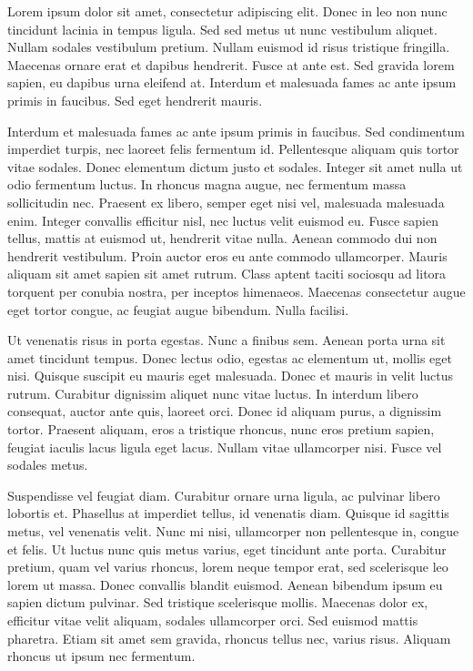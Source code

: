 \documentclass{book}
\begin{document}
            Lorem ipsum dolor sit amet, consectetur adipiscing elit. Donec in leo non nunc
               tincidunt lacinia in tempus ligula. Sed sed metus ut nunc vestibulum aliquet. Nullam
               sodales vestibulum pretium. Nullam euismod id risus tristique fringilla. Maecenas
               ornare erat et dapibus hendrerit. Fusce at ante est. Sed gravida lorem sapien, eu
               dapibus urna eleifend at. Interdum et malesuada fames ac ante ipsum primis in
               faucibus. Sed eget hendrerit mauris.
            
            Interdum et malesuada fames ac ante ipsum primis in faucibus. Sed condimentum
               imperdiet turpis, nec laoreet felis fermentum id. Pellentesque aliquam quis tortor
               vitae sodales. Donec elementum dictum justo et sodales. Integer sit amet nulla ut
               odio fermentum luctus. In rhoncus magna augue, nec fermentum massa sollicitudin nec.
               Praesent ex libero, semper eget nisi vel, malesuada malesuada enim. Integer convallis
               efficitur nisl, nec luctus velit euismod eu. Fusce sapien tellus, mattis at euismod
               ut, hendrerit vitae nulla. Aenean commodo dui non hendrerit vestibulum. Proin auctor
               eros eu ante commodo ullamcorper. Mauris aliquam sit amet sapien sit amet rutrum.
               Class aptent taciti sociosqu ad litora torquent per conubia nostra, per inceptos
               himenaeos. Maecenas consectetur augue eget tortor congue, ac feugiat augue bibendum.
               Nulla facilisi.
            
            Ut venenatis risus in porta egestas. Nunc a finibus sem. Aenean porta urna sit amet
               tincidunt tempus. Donec lectus odio, egestas ac elementum ut, mollis eget nisi.
               Quisque suscipit eu mauris eget malesuada. Donec et mauris in velit luctus rutrum.
               Curabitur dignissim aliquet nunc vitae luctus. In interdum libero consequat, auctor
               ante quis, laoreet orci. Donec id aliquam purus, a dignissim tortor. Praesent
               aliquam, eros a tristique rhoncus, nunc eros pretium sapien, feugiat iaculis lacus
               ligula eget lacus. Nullam vitae ullamcorper nisi. Fusce vel sodales metus.
            
            Suspendisse vel feugiat diam. Curabitur ornare urna ligula, ac pulvinar libero
               lobortis et. Phasellus at imperdiet tellus, id venenatis diam. Quisque id sagittis
               metus, vel venenatis velit. Nunc mi nisi, ullamcorper non pellentesque in, congue et
               felis. Ut luctus nunc quis metus varius, eget tincidunt ante porta. Curabitur
               pretium, quam vel varius rhoncus, lorem neque tempor erat, sed scelerisque leo lorem
               ut massa. Donec convallis blandit euismod. Aenean bibendum ipsum eu sapien dictum
               pulvinar. Sed tristique scelerisque mollis. Maecenas dolor ex, efficitur vitae velit
               aliquam, sodales ullamcorper orci. Sed euismod mattis pharetra. Etiam sit amet sem
               gravida, rhoncus tellus nec, varius risus. Aliquam rhoncus ut ipsum nec
               fermentum.
            
\end{document}
